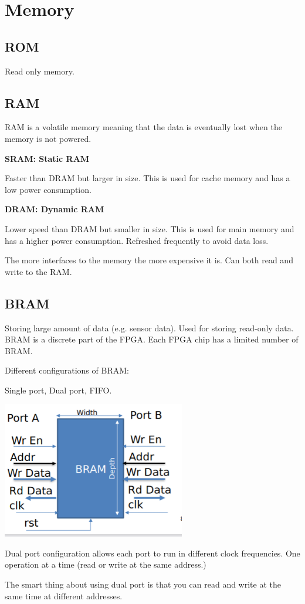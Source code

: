 \section{Memory}


\subsection{ROM}

Read only memory.


\subsection{RAM}

RAM is a volatile memory meaning that the data is eventually lost
when the memory is not powered.


\textbf{SRAM: Static RAM}

Faster than DRAM but larger in size.
This is used for cache memory and has a low power consumption.


\textbf{DRAM: Dynamic RAM}

Lower speed than DRAM but smaller in size.
This is used for main memory and has a higher power consumption.
Refreshed frequently to avoid data loss.


The more interfaces to the memory the more expensive it is.
Can both read and write to the RAM.



\subsection{BRAM}

Storing large amount of data (e.g. sensor data).
Used for storing read-only data.
BRAM is a discrete part of the FPGA. Each
FPGA chip has a limited number of BRAM.

Different configurations of BRAM:

Single port, Dual port, FIFO.

\begin{center}
	\includegraphics[width=0.6\textwidth]{images/BRAM.png}
\end{center}

Dual port configuration allows each port to run in different
clock frequencies.
One operation at a time (read or write at the same address.)

The smart thing about using dual port is that you can read
and write at the same time at different addresses.
